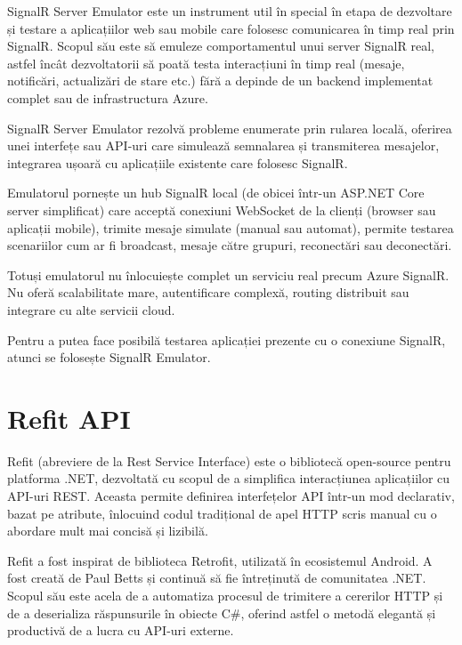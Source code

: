 SignalR Server Emulator este un instrument util în special în etapa de dezvoltare și testare a aplicațiilor web sau mobile care folosesc comunicarea în timp real prin SignalR. Scopul său este să emuleze comportamentul unui server SignalR real, astfel încât dezvoltatorii să poată testa interacțiuni în timp real (mesaje, notificări, actualizări de stare etc.) fără a depinde de un backend implementat complet sau de infrastructura Azure. \parencite{signalREmulator}

SignalR Server Emulator rezolvă probleme enumerate prin rularea locală, oferirea unei interfețe sau API-uri care simulează semnalarea și transmiterea mesajelor, integrarea ușoară cu aplicațiile existente care folosesc SignalR. \parencite{signalREmulator}

Emulatorul pornește un hub SignalR local (de obicei într-un ASP.NET Core server simplificat) care acceptă conexiuni WebSocket de la clienți (browser sau aplicații mobile), trimite mesaje simulate (manual sau automat), permite testarea scenariilor cum ar fi broadcast, mesaje către grupuri, reconectări sau deconectări. \parencite{signalREmulator}

Totuși emulatorul nu înlocuiește complet un serviciu real precum Azure SignalR. Nu oferă scalabilitate mare, autentificare complexă, routing distribuit sau integrare cu alte servicii cloud. \parencite{signalREmulator}

Pentru a putea face posibilă testarea aplicației prezente cu o conexiune SignalR, atunci se folosește SignalR Emulator.

\section{Refit API}

Refit (abreviere de la Rest Service Interface) este o bibliotecă open-source pentru platforma .NET, dezvoltată cu scopul de a simplifica interacțiunea aplicațiilor cu API-uri REST. Aceasta permite definirea interfețelor API într-un mod declarativ, bazat pe atribute, înlocuind codul tradițional de apel HTTP scris manual cu o abordare mult mai concisă și lizibilă. \parencite{refit}

Refit a fost inspirat de biblioteca Retrofit, utilizată în ecosistemul Android. A fost creată de Paul Betts și continuă să fie întreținută de comunitatea .NET. Scopul său este acela de a automatiza procesul de trimitere a cererilor HTTP și de a deserializa răspunsurile în obiecte C\#, oferind astfel o metodă elegantă și productivă de a lucra cu API-uri externe. \parencite{refit}

